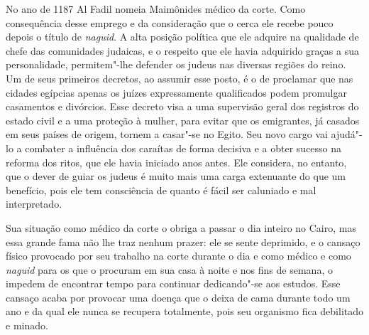 No ano de 1187 Al Fadil nomeia Maimônides médico da corte. Como
consequência desse emprego e da consideração que o cerca ele recebe
pouco depois o título de \emph{naguid}. A alta posição política que ele adquire
na qualidade de chefe das comunidades judaicas, e o respeito que ele havia
adquirido graças a sua personalidade, permitem"-lhe defender os judeus
nas diversas regiões do reino. Um de seus primeiros decretos, ao assumir
esse posto, é o de proclamar que nas cidades egípcias apenas os juízes
expressamente qualificados podem promulgar casamentos e divórcios. Esse
decreto visa a uma supervisão geral dos registros do estado civil e a
uma proteção à mulher, para evitar que os emigrantes, já casados em
seus países de origem, tornem a casar"-se no Egito. Seu novo cargo vai
ajudá"-lo a combater a influência dos caraítas de forma decisiva e a
obter sucesso na reforma dos ritos, que ele havia iniciado anos antes.
Ele considera, no entanto, que o dever de guiar os judeus é muito mais
uma carga extenuante do que um benefício, pois ele tem consciência de
quanto é fácil ser caluniado e mal interpretado.

Sua situação como médico da corte o obriga a passar o dia inteiro no
Cairo, mas essa grande fama não lhe traz nenhum prazer: ele se sente
deprimido, e o cansaço físico provocado por seu trabalho na corte
durante o dia e como médico e como \emph{naguid} para os que o procuram em sua
casa à noite e nos fins de semana, o impedem de encontrar tempo para
continuar dedicando"-se aos estudos. Esse cansaço acaba por provocar uma
doença que o deixa de cama durante todo um ano e da qual ele nunca se
recupera totalmente, pois seu organismo fica debilitado e minado.

